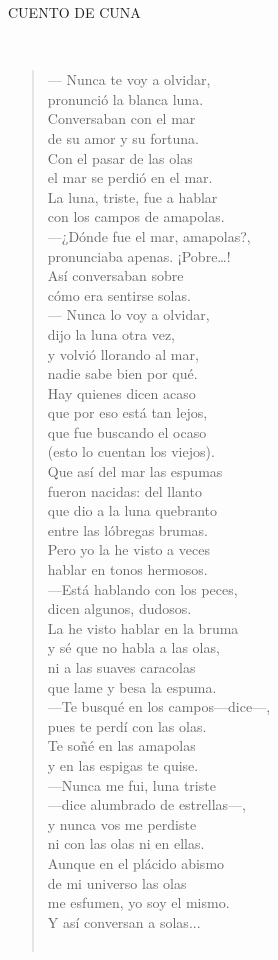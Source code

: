 \documentclass[a4paper, 12pt]{article}
\begin{document}
\centerline{CUENTO DE CUNA}
~ 
\begin{verse}
    
— Nunca te voy a olvidar,\\
pronunció la blanca luna.\\
Conversaban con el mar\\
de su amor y su fortuna.\\
Con el pasar de las olas\\
el mar se perdió en el mar.\\
La luna, triste, fue a hablar\\
con los campos de amapolas.\\
—¿Dónde fue el mar, amapolas?,\\
pronunciaba apenas. ¡Pobre…!\\
Así conversaban sobre\\
cómo era sentirse solas.\\
— Nunca lo voy a olvidar,\\
dijo la luna otra vez,\\
y volvió llorando al mar,\\
nadie sabe bien por qué.\\
Hay quienes dicen acaso\\
que por eso está tan lejos,\\
que fue buscando el ocaso\\
(esto lo cuentan los viejos).\\
Que así del mar las espumas\\
fueron nacidas: del llanto\\
que dio a la luna quebranto\\
entre las lóbregas brumas.\\
Pero yo la he visto a veces\\
hablar en tonos hermosos.\\
—Está hablando con los peces,\\
 dicen algunos, dudosos.\\
La he visto hablar en la bruma\\
y sé que no habla a las olas,\\
ni a las suaves caracolas\\
que lame y besa la espuma.\\
—Te busqué en los campos—dice—,\\
 pues te perdí con las olas.\\
Te soñé en las amapolas\\
y en las espigas te quise.\\
—Nunca me fui, luna triste\\
—dice alumbrado de estrellas—,\\
y nunca vos me perdiste\\
ni con las olas ni en ellas.\\
Aunque en el plácido abismo\\
de mi universo las olas\\
me esfumen, yo soy el mismo.\\
Y así conversan a solas...\\
\\
\end{verse}
\end{document}
